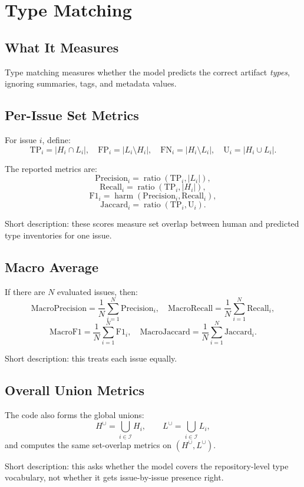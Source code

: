\documentclass[11pt]{article}
\begin{document}
\section{Type Matching}
\subsection{What It Measures}
Type matching measures whether the model predicts the correct artifact \emph{types}, ignoring summaries, tags, and metadata values.

\subsection{Per-Issue Set Metrics}
For issue $i$, define:
\[
\mathrm{TP}_i = |H_i \cap L_i|,\quad
\mathrm{FP}_i = |L_i \setminus H_i|,\quad
\mathrm{FN}_i = |H_i \setminus L_i|,\quad
\mathrm{U}_i = |H_i \cup L_i|.
\]

The reported metrics are:
\[
\mathrm{Precision}_i = \operatorname{ratio}(\mathrm{TP}_i, |L_i|),
\]
\[
\mathrm{Recall}_i = \operatorname{ratio}(\mathrm{TP}_i, |H_i|),
\]
\[
\mathrm{F1}_i = \operatorname{harm}(\mathrm{Precision}_i,\mathrm{Recall}_i),
\]
\[
\mathrm{Jaccard}_i = \operatorname{ratio}(\mathrm{TP}_i,\mathrm{U}_i).
\]

Short description: these scores measure set overlap between human and predicted type inventories for one issue.

\subsection{Macro Average}
If there are $N$ evaluated issues, then:
\[
\mathrm{MacroPrecision} = \frac{1}{N}\sum_{i=1}^{N}\mathrm{Precision}_i,
\quad
\mathrm{MacroRecall} = \frac{1}{N}\sum_{i=1}^{N}\mathrm{Recall}_i,
\]
\[
\mathrm{MacroF1} = \frac{1}{N}\sum_{i=1}^{N}\mathrm{F1}_i,
\quad
\mathrm{MacroJaccard} = \frac{1}{N}\sum_{i=1}^{N}\mathrm{Jaccard}_i.
\]

Short description: this treats each issue equally.

\subsection{Overall Union Metrics}
The code also forms the global unions:
\[
H^{\cup}=\bigcup_{i \in \mathcal{I}} H_i,
\qquad
L^{\cup}=\bigcup_{i \in \mathcal{I}} L_i,
\]
and computes the same set-overlap metrics on $(H^{\cup},L^{\cup})$.

Short description: this asks whether the model covers the repository-level type vocabulary, not whether it gets issue-by-issue presence right.
\end{document}
